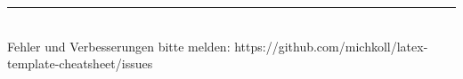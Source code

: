 \begin{multicols}{3}
\rule{0.3\linewidth}{0.25pt}
\\Fehler und Verbesserungen bitte melden: https://github.com/michkoll/latex-template-cheatsheet/issues
\scriptsize


\end{multicols}

